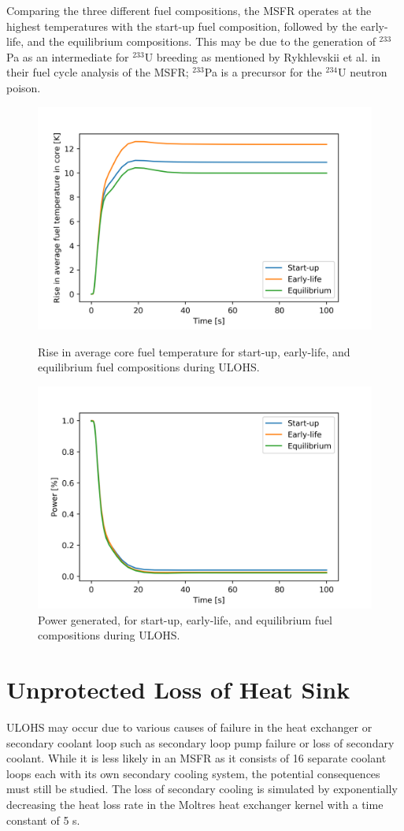 \documentclass{anstrans}
\begin{document}
	Comparing the three different fuel compositions, the \gls{MSFR} operates at
	the highest temperatures with the start-up fuel composition, followed by
	the early-life, and the equilibrium compositions. This may be due to the
	generation of $^{233}$Pa as an intermediate for $^{233}$U breeding as
	mentioned by Rykhlevskii et al. \cite{rykhlevskii_fuel_2019} in their fuel
	cycle analysis
	of the \gls{MSFR}; $^{233}$Pa is a precursor for the $^{234}$U neutron
	poison.
	
\begin{figure}[t] 
	\centering
	\includegraphics[width=.48\textwidth]{./figures/loscatemp}
	\captionsetup{justification=centering}
	\caption{Rise in average core fuel temperature for start-up, early-life,
	and equilibrium fuel compositions during \gls{ULOHS}.}
	\label{fig:loscatemp}
	\centering
	\includegraphics[width=.48\textwidth]{./figures/loscaheat}
	\captionsetup{justification=centering}
	\caption{Power generated, for start-up, early-life, and
	 equilibrium fuel compositions during \gls{ULOHS}.}
	\label{fig:loscaheat}
\end{figure} 

\section{Unprotected Loss of Heat Sink}

	\gls{ULOHS} may occur due to various causes of failure in the heat
	exchanger or secondary
	coolant loop such as secondary loop pump failure or loss of secondary
	coolant. While it is less likely in an \gls{MSFR} as it consists of 16
	separate coolant loops each with its own secondary cooling system, the
	potential consequences must still be studied.
	The loss of secondary cooling is simulated by exponentially decreasing
	the heat loss rate in the Moltres heat exchanger kernel with a time
	constant of 5 s.
	
\end{document}
